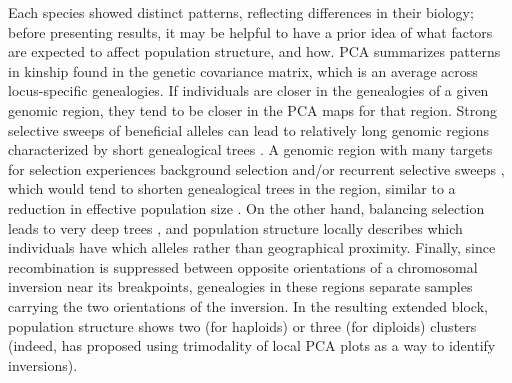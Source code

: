 \documentclass[11pt, oneside]{article}   	%
\begin{document}
Each species showed distinct patterns, reflecting differences in their biology;
before presenting results,
it may be helpful to have a prior idea of what factors are expected to affect population structure,
and how.
PCA summarizes patterns in kinship found in the genetic covariance matrix,
which is an average across locus-specific genealogies.
If individuals are closer in the genealogies of a given genomic region, 
they tend to be closer in the PCA maps for that region. 
Strong selective sweeps of beneficial alleles can lead to relatively long genomic regions
characterized by short genealogical trees \citep{przeworski2005signature,garud2013selective}.
A genomic region with many targets for selection experiences
background selection and/or recurrent selective sweeps \citep{stephan1992effect,coop2012patterns},
which would tend to shorten genealogical trees in the region,
similar to a reduction in effective population size \citep{hudson1995deleterious,sattath2011pervasive}.
On the other hand, balancing selection leads to very deep trees \citep{gao2014footprints},
and population structure locally describes which individuals have which alleles
rather than geographical proximity.
Finally, 
since recombination is suppressed between opposite orientations of a chromosomal inversion
near its breakpoints,
genealogies in these regions separate samples carrying the two orientations of the inversion.
In the resulting extended block, population structure shows two (for haploids) or three (for diploids) clusters
(indeed, \citep{ma2012investigation} has proposed using trimodality of local PCA plots
as a way to identify inversions).
\end{document}
